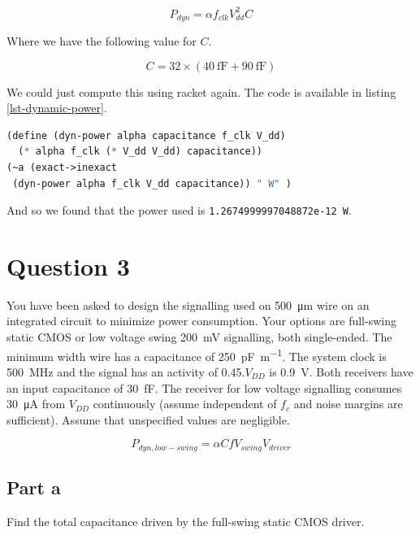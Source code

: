 \documentclass[hidelinks, 12pt]{article}
\begin{document}
\begin{equation}
\label{eq-dyn-pow}
P_{dyn} = \alpha f_{clk} V_{dd}^2 C
\end{equation}

Where we have the following value for \(C\).

\[C = 32 \times \left( \qty{40}{\femto\farad} + \qty{90}{\femto\farad}\right)\]

We could just compute this using racket again.
The code is available in listing \ref{lst-dynamic-power}.

\begin{lstlisting}[frame=single,basicstyle=\ttfamily,keywordstyle=\color{black}\bfseries\underbar,language=Lisp,label=lst-dynamic-power,caption={Racket implementation used to find the dynamic power of the output to the counter.},captionpos=b,numbers=none]
(define (dyn-power alpha capacitance f_clk V_dd)
  (* alpha f_clk (* V_dd V_dd) capacitance))
(~a (exact->inexact
 (dyn-power alpha f_clk V_dd capacitance)) " W" )
\end{lstlisting}

And so we found that the power used is \texttt{1.2674999997048872e-12 W}.
\section*{Question 3}
\label{sec:org3068282}
You have been asked to design the signalling used on \qty{500}{\micro \meter} wire on an integrated circuit to minimize power consumption. Your options are full-swing static CMOS or low voltage swing \qty{200}{\milli\volt} signalling, both single-ended. The minimum width wire has a capacitance of \qty{250}{\pico\farad\per \meter}. The system clock is \qty{500}{\mega\hertz} and the signal has an activity of 0.45.\(V_{DD}\) is \qty{0.9}{\volt}. Both receivers have an input capacitance of \qty{30}{\femto \farad}. The receiver for low voltage signalling consumes \qty{30}{\micro\ampere} from \(V_{DD}\) continuously (assume independent of \(f_{c}\) and noise margins are sufficient).
Assume that unspecified values are negligible.

\begin{equation}
\label{eq-low-swing-dyn}
P_{dyn, low-swing} = \alpha C f V_{swing} V_{driver}
\end{equation}
\subsection*{Part a}
\label{sec:orga755cae}
Find the total capacitance driven by the full-swing static CMOS driver.
\end{document}

